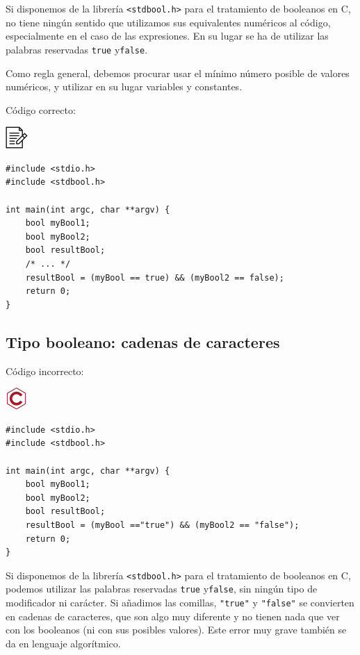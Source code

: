 \documentclass[
]{book}
\begin{document}
Si disponemos de la librería \texttt{\textless{}stdbool.h\textgreater{}} para el tratamiento de booleanos en C, no tiene ningún sentido que utilizamos sus equivalentes numéricos al código, especialmente en el caso de las expresiones. En su lugar se ha de utilizar las palabras reservadas \texttt{true} y\texttt{false}.

Como regla general, debemos procurar usar el mínimo número posible de valores numéricos, y utilizar en su lugar variables y constantes.

Código correcto:

\includegraphics{./img/alg.png}

\begin{verbatim}
#include <stdio.h>
#include <stdbool.h>

int main(int argc, char **argv) {
    bool myBool1;
    bool myBool2;
    bool resultBool;
    /* ... */
    resultBool = (myBool == true) && (myBool2 == false);
    return 0;
}
\end{verbatim}

\hypertarget{tipo-booleano-cadenas-de-caracteres}{%
\subsection{Tipo booleano: cadenas de caracteres}\label{tipo-booleano-cadenas-de-caracteres}}

Código incorrecto:

\includegraphics{./img/c_err.png}

\begin{verbatim}
#include <stdio.h>
#include <stdbool.h>

int main(int argc, char **argv) {
    bool myBool1;
    bool myBool2;
    bool resultBool;
    resultBool = (myBool =="true") && (myBool2 == "false");
    return 0;
}
\end{verbatim}

Si disponemos de la librería \texttt{\textless{}stdbool.h\textgreater{}} para el tratamiento de booleanos en C, podemos utilizar las palabras reservadas \texttt{true} y\texttt{false}, sin ningún tipo de modificador ni carácter. Si añadimos las comillas, \texttt{"true"} y \texttt{"false"} se convierten en cadenas de caracteres, que son algo muy diferente y no tienen nada que ver con los booleanos (ni con sus posibles valores). Este error muy grave también se da en lenguaje algorítmico.
\end{document}
